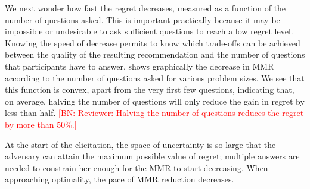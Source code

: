 \documentclass{article}
\newcommand{\commentBN}[1]{\textcolor{red}{\small$\big[$BN: #1$\big]$}}
\begin{document}
%

We next wonder how fast the regret decreases, measured as a function of the number of questions asked. This is important practically because it may be impossible or undesirable to ask sufficient questions to reach a low regret level. Knowing the speed of decrease permits to know which trade-offs can be achieved between the quality of the resulting recommendation and the number of questions that participants have to answer.  shows graphically the decrease in MMR according to the number of questions asked for various problem sizes. We see that this function is convex, apart from the very first few questions, indicating %
that, on average, halving the number of questions will only reduce the gain in regret by less than half. \commentBN{Reviewer: Halving the number of questions reduces the regret by more than 50\%.}

At the start of the elicitation, the space of uncertainty is so large that the adversary can attain the maximum possible value of regret; multiple answers are needed to constrain her enough for the MMR to start decreasing. When approaching optimality, the pace of MMR reduction decreases.


\end{document}
